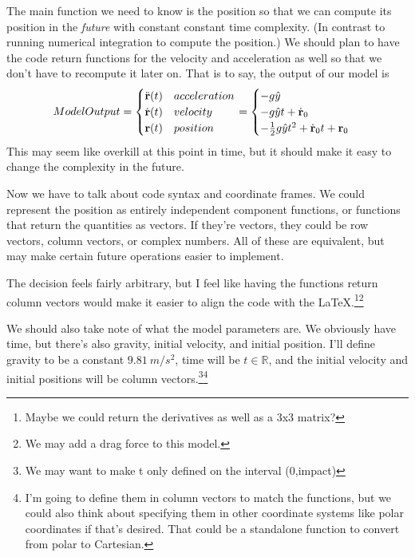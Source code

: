 \documentclass[12pt, letterpaper]{article}
\begin{document}
The main function we need to know is the position so that we can compute its position in the \textit{future} with constant constant time complexity. (In contrast to running numerical integration to compute the position.) We should plan to have the code return functions for the velocity and acceleration as well so that we don't have to recompute it later on. That is to say, the output of our model is 
\begin{align*}
Model Output =
\begin{cases} 
\ddot{\bf r}(t) & acceleration \\
\dot{\bf r}(t) & velocity \\
{\bf r}(t) & position
\end{cases}
= 
\begin{cases}
-g\hat{y} \\
-g\hat{y}t + \dot{\bf r}_0 \\
-\frac12g\hat{y}t^2 + \dot{\bf r}_0t + {\bf r}_0
\end{cases}
\end{align*}
This may seem like overkill at this point in time, but it should make it easy to change the complexity in the future. 

Now we have to talk about code syntax and coordinate frames. We could represent the position as entirely independent component functions, or functions that return the quantities as vectors. If they're vectors, they could be row vectors, column vectors, or complex numbers. All of these are equivalent, but may make certain future operations easier to implement. 

The decision feels fairly arbitrary, but I feel like having the functions return column vectors would make it easier to align the code with the LaTeX.\footnote{Maybe we could return the derivatives as well as a 3x3 matrix?}\footnote{We may add a drag force to this model.}

We should also take note of what the model parameters are. We obviously have time, but there's also gravity, initial velocity, and initial position. I'll define gravity to be a constant $9.81\ m/s^2$, time will be $t \in \mathbb{R}$, and the initial velocity and initial positions will be column vectors.\footnote{We may want to make t only defined on the interval (0,impact)}\footnote{I'm going to define them in column vectors to match the functions, but we could also think about specifying them in other coordinate systems like polar coordinates if that's desired. That could be a standalone function to convert from polar to Cartesian.} 
\end{document}
